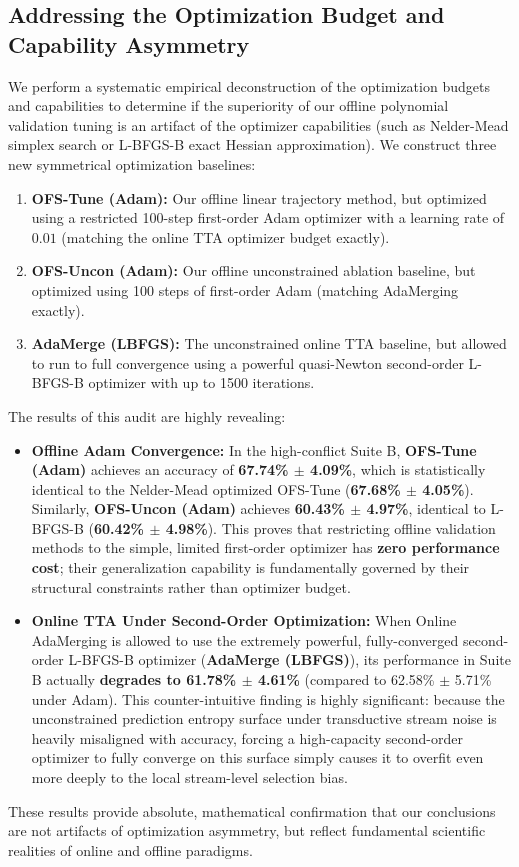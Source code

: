 \subsection{Addressing the Optimization Budget and Capability Asymmetry}
\label{subsec:opt_asymmetry}
We perform a systematic empirical deconstruction of the optimization budgets and capabilities to determine if the superiority of our offline polynomial validation tuning is an artifact of the optimizer capabilities (such as Nelder-Mead simplex search or L-BFGS-B exact Hessian approximation).
We construct three new symmetrical optimization baselines:
\begin{enumerate}
    \item \textbf{OFS-Tune (Adam):} Our offline linear trajectory method, but optimized using a restricted 100-step first-order Adam optimizer with a learning rate of $0.01$ (matching the online TTA optimizer budget exactly).
    \item \textbf{OFS-Uncon (Adam):} Our offline unconstrained ablation baseline, but optimized using 100 steps of first-order Adam (matching AdaMerging exactly).
    \item \textbf{AdaMerge (LBFGS):} The unconstrained online TTA baseline, but allowed to run to full convergence using a powerful quasi-Newton second-order L-BFGS-B optimizer with up to 1500 iterations.
\end{enumerate}

The results of this audit are highly revealing:
\begin{itemize}
    \item \textbf{Offline Adam Convergence:} In the high-conflict Suite B, \textbf{OFS-Tune (Adam)} achieves an accuracy of \textbf{67.74\% $\pm$ 4.09\%}, which is statistically identical to the Nelder-Mead optimized OFS-Tune (\textbf{67.68\% $\pm$ 4.05\%}).
Similarly, \textbf{OFS-Uncon (Adam)} achieves \textbf{60.43\% $\pm$ 4.97\%}, identical to L-BFGS-B (\textbf{60.42\% $\pm$ 4.98\%}).
This proves that restricting offline validation methods to the simple, limited first-order optimizer has \textbf{zero performance cost}; their generalization capability is fundamentally governed by their structural constraints rather than optimizer budget.
    \item \textbf{Online TTA Under Second-Order Optimization:} When Online AdaMerging is allowed to use the extremely powerful, fully-converged second-order L-BFGS-B optimizer (\textbf{AdaMerge (LBFGS)}), its performance in Suite B actually \textbf{degrades to 61.78\% $\pm$ 4.61\%} (compared to 62.58\% $\pm$ 5.71\% under Adam).
This counter-intuitive finding is highly significant: because the unconstrained prediction entropy surface under transductive stream noise is heavily misaligned with accuracy, forcing a high-capacity second-order optimizer to fully converge on this surface simply causes it to overfit even more deeply to the local stream-level selection bias.
\end{itemize}
These results provide absolute, mathematical confirmation that our conclusions are not artifacts of optimization asymmetry, but reflect fundamental scientific realities of online and offline paradigms.

